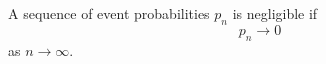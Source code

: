 \begin{definition}
A sequence of event probabilities \(p_n\) is negligible if
\[
p_n\to 0
\]
as \(n\to\infty\).
\end{definition}
